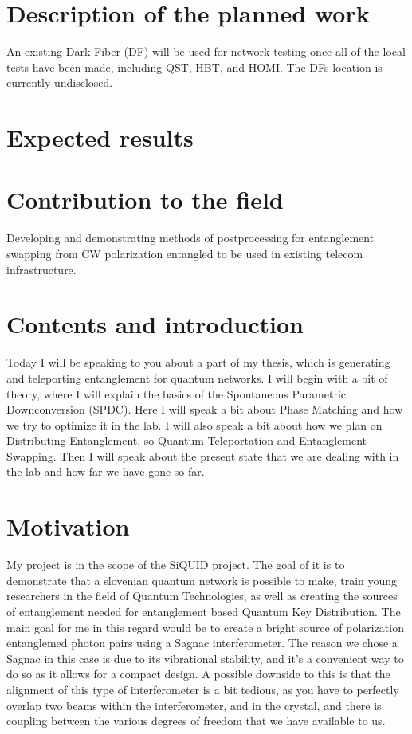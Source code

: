 \documentclass{article}
\theoremstyle{mytheoremstyle}
\theoremstyle{mytheoremstyle}
\theoremstyle{myproblemstyle}
\begin{document}
\section{Description of the planned work}

An existing Dark Fiber (DF) will be used for network testing once all of the local tests have been made, including QST, HBT, and HOMI. 
The DFs location is currently undisclosed.

\section{Expected results}

\section{Contribution to the field}
Developing and demonstrating methods of postprocessing for entanglement swapping from CW polarization entangled to be used in existing telecom infrastructure.


\section{Contents and introduction}
Today I will be speaking to you about a part of my thesis, which is generating and teleporting entanglement for quantum networks. I will begin with a bit of theory,
where I will explain the basics of the Spontaneous Parametric Downconversion (SPDC). Here I will speak a bit about Phase Matching and how we try to optimize it in the lab. I will also
speak a bit about how we plan on Distributing Entanglement, so Quantum Teleportation and Entanglement Swapping.
Then I will speak about the present state that we are dealing with in the lab and how far we have gone so far.

\section{Motivation}
My project is in the scope of the SiQUID project. The goal of it is to demonstrate that a slovenian quantum network is possible to make,
train young researchers in the field of Quantum Technologies, as well as creating the sources of entanglement needed for entanglement based Quantum Key Distribution.
The main goal for me in this regard would be to create a bright source of polarization entanglemed photon pairs using a Sagnac interferometer.
The reason we chose a Sagnac in this case is due to its vibrational stability, and it's a convenient way to do so as it allows for a compact design.
A possible downside to this is that the alignment of this type of interferometer is a bit tedious, as you have to perfectly overlap two beams within the interferometer,
and in the crystal, and there is coupling between the various degrees of freedom that we have available to us.
\end{document}
